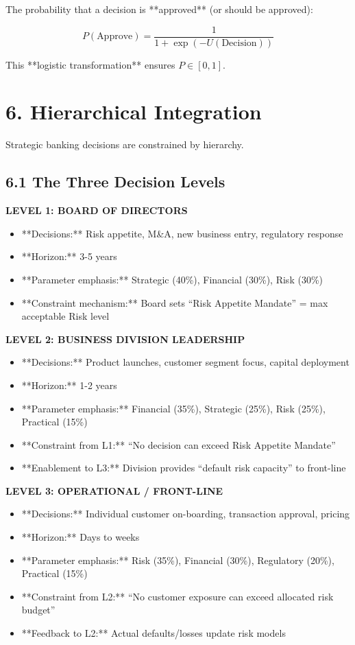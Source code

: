 \documentclass[11pt]{article}
\begin{document}
The probability that a decision is **approved** (or should be approved):

\begin{equation}
P(\text{Approve}) = \frac{1}{1 + \exp(-U(\text{Decision}))}
\end{equation}

This **logistic transformation** ensures $P \in [0, 1]$.

\section{6. Hierarchical Integration}

Strategic banking decisions are constrained by hierarchy.

\subsection{6.1 The Three Decision Levels}

\textbf{LEVEL 1: BOARD OF DIRECTORS}
\begin{itemize}
\item **Decisions:** Risk appetite, M\&A, new business entry, regulatory response
\item **Horizon:** 3-5 years
\item **Parameter emphasis:** Strategic (40\%), Financial (30\%), Risk (30\%)
\item **Constraint mechanism:** Board sets ``Risk Appetite Mandate'' = max acceptable Risk level
\end{itemize}

\textbf{LEVEL 2: BUSINESS DIVISION LEADERSHIP}
\begin{itemize}
\item **Decisions:** Product launches, customer segment focus, capital deployment
\item **Horizon:** 1-2 years
\item **Parameter emphasis:** Financial (35\%), Strategic (25\%), Risk (25\%), Practical (15\%)
\item **Constraint from L1:** ``No decision can exceed Risk Appetite Mandate''
\item **Enablement to L3:** Division provides ``default risk capacity'' to front-line
\end{itemize}

\textbf{LEVEL 3: OPERATIONAL / FRONT-LINE}
\begin{itemize}
\item **Decisions:** Individual customer on-boarding, transaction approval, pricing
\item **Horizon:** Days to weeks
\item **Parameter emphasis:** Risk (35\%), Financial (30\%), Regulatory (20\%), Practical (15\%)
\item **Constraint from L2:** ``No customer exposure can exceed allocated risk budget''
\item **Feedback to L2:** Actual defaults/losses update risk models
\end{itemize}
\end{document}

